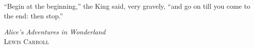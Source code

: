 \thispagestyle{empty}
{}

\vspace*{6cm}

\epigraph{``Begin at the beginning,'' the King said, very gravely, ``and go on till you come to the end: then stop.''}{\textit{Alice’s Adventures in Wonderland}\\\textsc{Lewis Carroll}}

